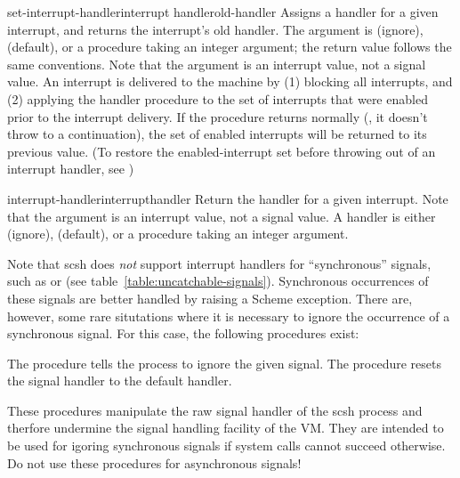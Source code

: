 \begin{defundesc}{set-interrupt-handler}{interrupt handler}{old-handler}
Assigns a handler for a given interrupt, 
and returns the interrupt's old handler.
The  argument is  (ignore),  (default), or a
procedure taking an integer argument; 
the return value follows the same conventions.
Note that the  argument is an interrupt value, 
not a signal value.
An interrupt is delivered to the {\scm} machine by (1) blocking all interrupts,
and (2) applying the handler procedure to the set of interrupts 
that were enabled prior to the interrupt delivery.
If the procedure returns normally (\ie, it doesn't throw to a continuation), 
the set of enabled interrupts will be returned to its previous value.
(To restore the enabled-interrupt set before throwing out of an interrupt
handler, see )


\end{defundesc}

\begin{defundesc}{interrupt-handler}{interrupt}{handler}
Return the handler for a given interrupt.
Note that the argument is an interrupt value, not a signal value.
A handler is either  (ignore),  (default), or a
procedure taking an integer argument.
\end{defundesc}

Note that scsh does \emph{not} support interrupt handlers for
``synchronous'' {\Unix} signals, such as  or
 (see table~\ref{table:uncatchable-signals}).
Synchronous occurrences of these signals are better handled by raising
a Scheme exception. There are, however, some rare situtations where it
is necessary to ignore the occurrence of a synchronous signal. For
this case, the following procedures exist:

\begin{desc}
  The procedure  tells the process to ignore the
  given signal. The procedure  resets the
  signal handler to the default handler.

  These procedures manipulate the raw signal handler of the scsh
  process and therfore undermine the signal handling facility of the
  VM.  They are intended to be used for igoring synchronous signals if
  system calls cannot succeed otherwise. Do not use these procedures
  for asynchronous signals!
\end{desc}

